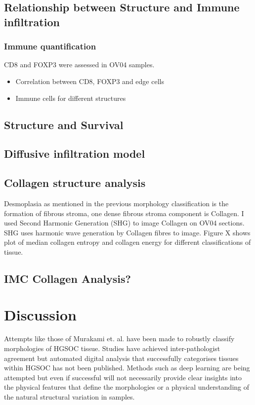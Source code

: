 \subsection{Relationship between Structure and Immune infiltration}

\subsubsection{Immune quantification}

CD8 and FOXP3 were assessed in OV04 samples.
\begin{itemize}
    \item Correlation between CD8, FOXP3 and edge cells
    \item Immune cells for different structures
\end{itemize}

\subsection{Structure and Survival}

\subsection{Diffusive infiltration model}


\subsection{Collagen structure analysis}
Desmoplasia as mentioned in the previous morphology classification is the formation of fibrous stroma, one dense fibrous stroma component is Collagen. I used Second Harmonic Generation (SHG) to image Collagen on OV04 sections. SHG uses harmonic wave generation by Collagen fibres to image. Figure X shows plot of median collagen entropy and collagen energy for different classifications of tissue.

\subsection{IMC Collagen Analysis?}

\section{Discussion}

Attempts like those of Murakami et. al. \cite{murakami2016establishment} have been made to robustly classify morphologies of HGSOC tissue. Studies have achieved inter-pathologist agreement but automated digital analysis that successfully categorises tissues within HGSOC has not been published. Methods such as deep learning are being attempted but even if successful will not necessarily provide clear insights into the physical features that define the morphologies or a physical understanding of the natural structural variation in samples.

